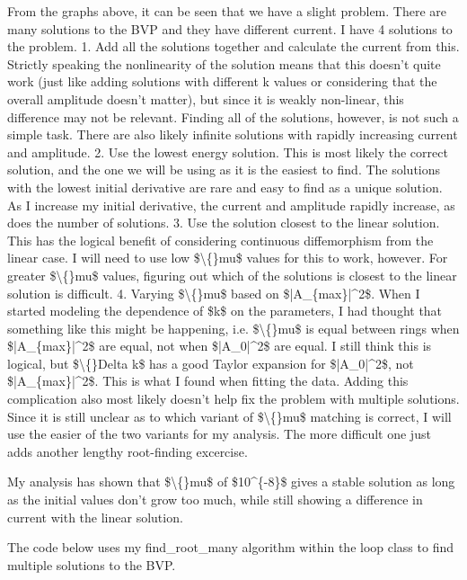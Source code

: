 \documentclass{article}
\begin{document}
From the graphs above, it can be seen that we have a slight problem. There are many solutions to the BVP and they have different current. I have 4 solutions to the problem.
1. Add all the solutions together and calculate the current from this. Strictly speaking the nonlinearity of the solution means that this doesn't quite work (just like adding solutions with different k values or considering that the overall amplitude doesn't matter), but since it is weakly non-linear, this difference may not be relevant. Finding all of the solutions, however, is not such a simple task. There are also likely infinite solutions with rapidly increasing current and amplitude.
2. Use the lowest energy solution. This is most likely the correct solution, and the one we will be using as it is the easiest to find. The solutions with the lowest initial derivative are rare and easy to find as a unique solution. As I increase my initial derivative, the current and amplitude rapidly increase, as does the number of solutions.
3. Use the solution closest to the linear solution. This has the logical benefit of considering continuous diffemorphism from the linear case. I will need to use low \$\textbackslash\{\}mu\$ values for this to work, however. For greater \$\textbackslash\{\}mu\$ values, figuring out which of the solutions is closest to the linear solution is difficult.
4. Varying \$\textbackslash\{\}mu\$ based on \$|A\_\{max\}|\textasciicircum{}2\$. When I started modeling the dependence of \$k\$ on the parameters, I had thought that something like this might be happening, i.e. \$\textbackslash\{\}mu\$ is equal between rings when \$|A\_\{max\}|\textasciicircum{}2\$ are equal, not when \$|A\_0|\textasciicircum{}2\$ are equal. I still think this is logical, but \$\textbackslash\{\}Delta k\$ has a good Taylor expansion for \$|A\_0|\textasciicircum{}2\$, not \$|A\_\{max\}|\textasciicircum{}2\$. This is what I found when fitting the data. Adding this complication also most likely doesn't help fix the problem with multiple solutions. Since it is still unclear as to which variant of \$\textbackslash\{\}mu\$ matching is correct, I will use the easier of the two variants for my analysis. The more difficult one just adds another lengthy root-finding excercise.

My analysis has shown that \$\textbackslash\{\}mu\$ of \$10\textasciicircum{}\{-8\}\$ gives a stable solution as long as the initial values don't grow too much, while still showing a difference in current with the linear solution.

The code below uses my find\_root\_many algorithm within the loop class to find multiple solutions to the BVP.
\end{document}
